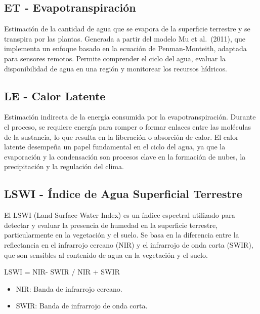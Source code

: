 \documentclass[
]{book}
\begin{document}
\subsection{\texorpdfstring{\textbf{ET} - Evapotranspiración}{ET - Evapotranspiración}}\label{et---evapotranspiraciuxf3n}

Estimación de la cantidad de agua que se evapora de la superficie terrestre y se transpira por las plantas. Generada a partir del modelo Mu et al.~(2011), que implementa un enfoque basado en la ecuación de Penman-Monteith, adaptada para sensores remotos. Permite comprender el ciclo del agua, evaluar la disponibilidad de agua en una región y monitorear los recursos hídricos.

\subsection{\texorpdfstring{\textbf{LE} - Calor Latente}{LE - Calor Latente}}\label{le---calor-latente}

Estimación indirecta de la energía consumida por la evapotranspiración. Durante el proceso, se requiere energía para romper o formar enlaces entre las moléculas de la sustancia, lo que resulta en la liberación o absorción de calor. El calor latente desempeña un papel fundamental en el ciclo del agua, ya que la evaporación y la condensación son procesos clave en la formación de nubes, la precipitación y la regulación del clima.

\subsection{\texorpdfstring{\textbf{LSWI} - Índice de Agua Superficial Terrestre}{LSWI - Índice de Agua Superficial Terrestre}}\label{lswi---uxedndice-de-agua-superficial-terrestre}

El LSWI (Land Surface Water Index) es un índice espectral utilizado para detectar y evaluar la presencia de humedad en la superficie terrestre, particularmente en la vegetación y el suelo. Se basa en la diferencia entre la reflectancia en el infrarrojo cercano (NIR) y el infrarrojo de onda corta (SWIR), que son sensibles al contenido de agua en la vegetación y el suelo.

LSWI = NIR- SWIR / NIR + SWIR\hspace{0pt}

\begin{itemize}
\item
  NIR: Banda de infrarrojo cercano.
\item
  SWIR: Banda de infrarrojo de onda corta.
\end{itemize}
\end{document}
